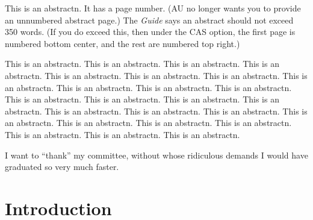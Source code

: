 \documentclass[12pt,econ]{authesis}
\begin{document}
\begin{frontmatter}



\abstractn

This is an abstractn.  It has a page number.
(AU no longer wants you to provide an unnumbered abstract page.)
The \emph{Guide} says an abstract should not exceed 350 words.
(If you do exceed this,
then under the CAS option, the first page is numbered bottom center, and the rest are numbered top right.)

This is an abstractn. This is an abstractn. This is an abstractn. This is an abstractn. This is an abstractn. This is an abstractn. This is an abstractn. This is an abstractn. This is an abstractn. This is an abstractn. This is an abstractn. This is an abstractn. This is an abstractn. This is an abstractn. This is an abstractn. This is an abstractn. This is an abstractn. This is an abstractn. This is an abstractn. This is an abstractn. This is an abstractn. This is an abstractn. This is an abstractn. This is an abstractn. This is an abstractn. 




\acknowledgements

I want to ``thank'' my committee,
without whose ridiculous demands I would have graduated so very much faster.


\tableofcontents

\listoftables

\listoffigures

\end{frontmatter}


\chapter{Introduction} %
\end{document}
